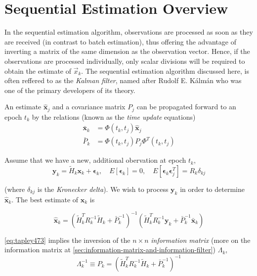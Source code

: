 \section{Sequential Estimation Overview}
In the sequential estimation algorithm, observations are processed as soon as they
are received (in contrast to batch estimation), thus offering the advantage of
inverting a matrix of the same dimension as the observation vector. Hence, if the
observations are processed individually, only scalar divisions will be required to
obtain the estimate of \(\vec{x}_k\). The sequential estimation algorithm discussed
here, is often reffered to as the \emph{Kalman filter}, named after Rudolf E. K\'alm\'an
who was one of the primary developers of its theory.

An estimate \(\hat{\bm{x}}_j \) and a covariance matrix \(P_j\) can be
propagated forward to an epoch \(t_k\) by the relations (known as the
\emph{time update} equations)
\begin{subequations}
	\label{eq:tapley471}
	\begin{align}
		\bar{\bm{x}} _k & = \Phi (t_k, t_j) \hat{\bm{x}}_j
		\label{eq:tapley471a} \\
		\bar{P}_k       & = \Phi (t_k, t_j) P_j \Phi ^T (t_k, t_j)
		\label{eq:tapley471b}
	\end{align}
\end{subequations}


Assume that we have a new, additional obervation at epoch \(t_k\),
\begin{equation}
	\bm{y}_k = \tilde{H}_k \bm{x}_k + \bm{\epsilon} _k ,
	\quad E\left[\bm{\epsilon} _k \right] = 0,
	\quad E\left[\bm{\epsilon} _k \bm{\epsilon} ^T_j \right] = R_k \delta _{kj}
\end{equation}

(where \(\delta _{kj}\) is the \emph{Kronecker delta}). We wish to process
\(\bm{y} _k\) in order to determine \(\hat{\bm{x}} _k\). The best estimate of
\(\bm{x} _k\) is

\begin{equation}
	\label{eq:tapley473}
	\hat{\bm{x}} _k = \left( \tilde{H}^T_k R^{-1}_k \tilde{H}_k + \bar{P}^{-1}_k \right)^{-1} \left( \tilde{H}^T_k R^{-1}_k \bm{y}_k + \bar{P}^{-1}_k \bar{\bm{x}}_k \right)
\end{equation}

\ref{eq:tapley473} implies the inversion of the \(n \times n\) \emph{information matrix} 
(more on the information matrix at \ref{sec:information-matrix-and-information-filter}) \(\Lambda _k\),
\begin{equation}
	\label{eq:tapley474}
	\Lambda ^{-1}_k \equiv P_k =
	\left( \tilde{H}^T_k R^{-1}_k \tilde{H}_k + \bar{P}^{-1}_k \right)^{-1}
\end{equation}

